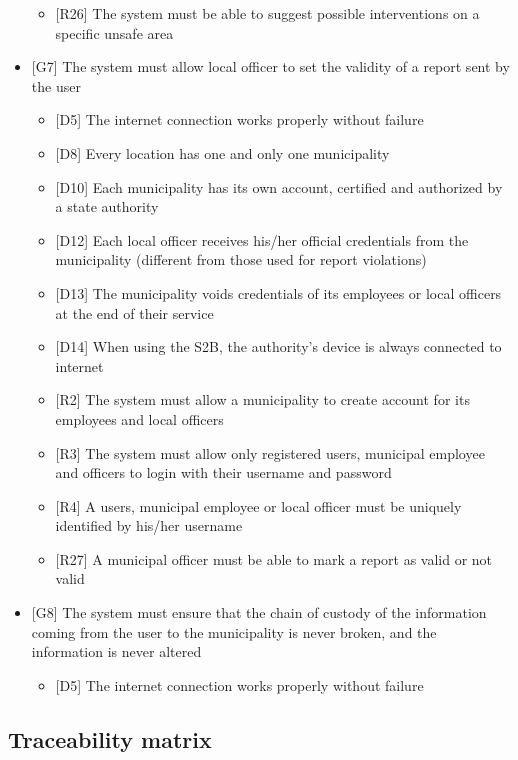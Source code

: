 \begin{itemize}
\begin{itemize}
								\item {[R26]} The system must be able to suggest possible interventions on a specific unsafe area
							\end{itemize}
						\item {[G7]} The system must allow local officer to set the validity of a report sent by the user
							\begin{itemize}
								\item {[D5]} The internet connection works properly without failure
								\item {[D8]} Every location has one and only one municipality
								\item {[D10]} Each municipality has its own account, certified and authorized by a state authority
								\item {[D12]} Each local officer receives his/her official credentials from the municipality (different from those used for report violations)
								\item {[D13]} The municipality voids credentials of its employees or local officers at the end of their service
								\item {[D14]} When using the S2B, the authority's device is always connected to internet
								\item {[R2]} The system must allow a municipality to create account for its employees and local officers
								\item {[R3]} The system must allow only registered users, municipal employee and officers to login with their username and password
								\item {[R4]} A users, municipal employee or local officer must be uniquely identified by his/her username
								\item {[R27]} A municipal officer must be able to mark a report as valid or not valid
							\end{itemize}
						\item {[G8]} The system must ensure that the chain of custody of the information coming from the user to the municipality is never broken, and the information is never altered
							\begin{itemize}
								\item {[D5]} The internet connection works properly without failure
							\end{itemize}
					\end{itemize}
			\subsection{Traceability matrix}
